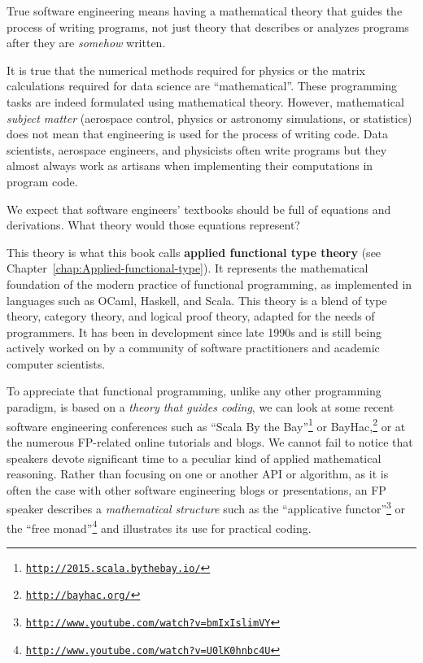 True software engineering means having a mathematical theory that
guides the process of writing programs, \textemdash{} not just theory
that describes or analyzes programs after they are \emph{somehow}
written.

It is true that the numerical methods required for physics or the
matrix calculations required for data science are \textsf{``}mathematical\textsf{''}.
These programming tasks are indeed formulated using mathematical theory.
However, mathematical \emph{subject matter} (aerospace control, physics
or astronomy simulations, or statistics) does not mean that engineering
is used for the process of writing code. Data scientists, aerospace
engineers, and physicists often write programs \textemdash{} but they
almost always work as artisans when implementing their computations
in program code.

We expect that software engineers\textsf{'} textbooks should be full
of equations and derivations. What theory would those equations represent?

This theory is what this book calls \textbf{applied functional type
theory} (see Chapter~\ref{chap:Applied-functional-type}).
It represents the mathematical foundation of the modern practice of
functional programming, as implemented in languages such as OCaml,
Haskell, and Scala. This theory is a blend of type theory, category
theory, and logical proof theory, adapted for the needs of programmers.
It has been in development since late 1990s and is still being actively
worked on by a community of software practitioners and academic computer
scientists.

To appreciate that functional programming, unlike any other programming
paradigm, is based on a \emph{theory that guides coding}, we can look
at some recent software engineering conferences such as \textsf{``}Scala By
the Bay\textsf{''}\footnote{\texttt{\href{http://2015.scala.bythebay.io/}{http://2015.scala.bythebay.io/}}}
or BayHac,\footnote{\texttt{\href{http://bayhac.org/}{http://bayhac.org/}}}
or at the numerous FP-related online tutorials and blogs. We cannot
fail to notice that speakers devote significant time to a peculiar
kind of applied mathematical reasoning. Rather than focusing on one
or another API or algorithm, as it is often the case with other software
engineering blogs or presentations, an FP speaker describes a \emph{mathematical
structure} \textemdash{} such as the \textsf{``}applicative functor\textsf{''}\footnote{\texttt{\href{http://www.youtube.com/watch?v=bmIxIslimVY}{http://www.youtube.com/watch?v=bmIxIslimVY}}}
or the \textsf{``}free monad\textsf{''}\footnote{\texttt{\href{http://www.youtube.com/watch?v=U0lK0hnbc4U}{http://www.youtube.com/watch?v=U0lK0hnbc4U}}}
\textemdash{} and illustrates its use for practical coding.


